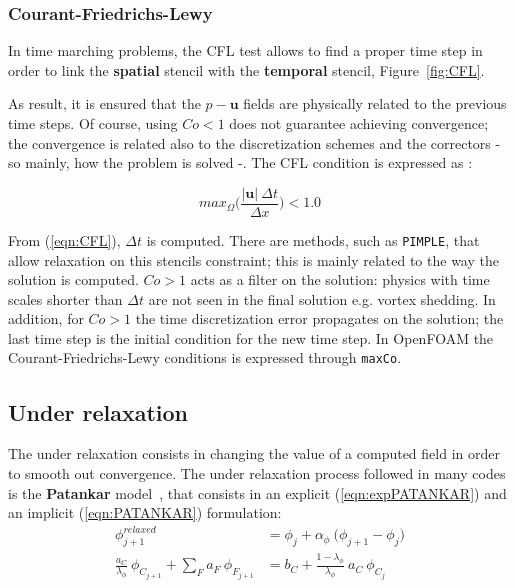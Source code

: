 \subsubsection{Courant-Friedrichs-Lewy} 
In time marching problems, the CFL test allows to find a proper time step in order to link the \textbf{spatial} stencil with the \textbf{temporal} stencil, Figure~\ref{fig:CFL}.



As result, it is ensured that the $p - \boldsymbol{u}$ fields are physically related to the previous time steps. Of course, using $Co < 1$ does not guarantee achieving convergence; the convergence is related also to the discretization schemes and the correctors - so mainly, how the problem is solved -. The CFL condition is expressed as \cite[Ch. 13]{quarteroni2012numerical}:

\begin{equation}
    max_{\Omega} \Bigg( \frac{\big| \boldsymbol{u} \big| \ \Delta t}{\Delta x} \Bigg) < 1.0
    \label{eqn:CFL}
\end{equation}

\noindent From (\ref{eqn:CFL}), $\Delta t$ is computed. There are methods, such as \verb|PIMPLE|, that allow relaxation on this stencils constraint; this is mainly related to the way the solution is computed. $Co > 1$ acts as a filter on the solution: physics with time scales shorter than $\Delta t$ are not seen in the final solution e.g. vortex shedding. In addition, for $Co > 1$ the time discretization error propagates on the solution; the last time step is the initial condition for the new time step. In OpenFOAM the Courant-Friedrichs-Lewy conditions is expressed through \verb|maxCo|. 

\subsection{Under relaxation}
The under relaxation consists in changing the value of a computed field in order to smooth out convergence. The under relaxation process followed in many codes is the \textbf{Patankar} model~\cite[Ch. 14.1]{moukalled2016finite}, that consists in an explicit (\ref{eqn:expPATANKAR}) and an implicit (\ref{eqn:PATANKAR}) formulation:
\begin{align}
    \phi_{j + 1}^{relaxed} & = \phi_{j} + \alpha_{\phi} \ \big( \phi_{j + 1} - \phi_{j} \big) \label{eqn:expPATANKAR} \\ 
    \frac{a_C}{\lambda_{\phi}} \ \phi_{C_{j + 1}} + \sum_F a_F \ \phi_{F_{j + 1}} & = b_C + \frac{1 - \lambda_{\phi}}{\lambda_{\phi}} \ a_C \ \phi_{C_j} 
    \label{eqn:PATANKAR}
\end{align}

